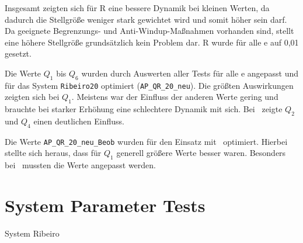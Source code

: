 Insgesamt zeigten sich für R eine bessere Dynamik bei kleinen Werten, da dadurch die Stellgröße weniger stark gewichtet wird und somit höher sein darf.
Da geeignete Begrenzungs- und Anti-Windup-Maßnahmen vorhanden sind, stellt eine höhere Stellgröße grundsätzlich kein Problem dar.
R wurde für alle \ap e auf 0,01 gesetzt.

Die Werte $Q_1$ bis $Q_6$ wurden durch Auswerten aller Tests für alle \ap e angepasst und für das System \texttt{Ribeiro20} optimiert (\texttt{AP\_QR\_20\_neu}).
Die größten Auswirkungen zeigten sich bei $Q_1$. 
Meistens war der Einfluss der anderen Werte gering und brauchte bei starker Erhöhung eine schlechtere Dynamik mit sich.
Bei \apv\ zeigte $Q_2$ und $Q_4$ einen deutlichen Einfluss.

Die Werte \texttt{AP\_QR\_20\_neu\_Beob} wurden für den Einsatz mit \beob\ optimiert.
Hierbei stellte sich heraus, dass für $Q_1$ generell größere Werte besser waren.
Besonders bei \apv\ mussten die Werte angepasst werden.


\section{System Parameter Tests}\label{sec:x0sys}

System Ribeiro

